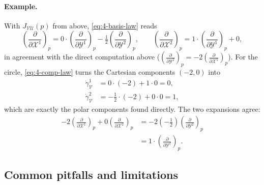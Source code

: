 \documentclass[11pt]{article}
\begin{document}
\paragraph{Example.} With $J_{\mathcal{VU}}(p)$ from above, \eqref{eq:4-basis-law} reads
\[
\left(\frac{\partial}{\partial\mathcal X^1}\right)_p=0\cdot\left(\frac{\partial}{\partial\mathcal Y^1}\right)_p-\tfrac12\left(\frac{\partial}{\partial\mathcal Y^2}\right)_p,\qquad
\left(\frac{\partial}{\partial\mathcal X^2}\right)_p=1\cdot\left(\frac{\partial}{\partial\mathcal Y^1}\right)_p+0,
\]
in agreement with the direct computation above ($\left(\frac{\partial}{\partial\mathcal Y^2}\right)_p=-2\left(\frac{\partial}{\partial\mathcal X^1}\right)_p$). For the circle, \eqref{eq:4-comp-law} turns the Cartesian components $(-2,0)$ into
\begin{align*}
\dot\gamma^1_{\mathcal V}&=0\cdot(-2)+1\cdot0=0,\\
\dot\gamma^2_{\mathcal V}&=-\tfrac12\cdot(-2)+0\cdot0=1,
\end{align*}
which are exactly the polar components found directly. The two expansions agree:
\begin{align*}
-2\left(\frac{\partial}{\partial\mathcal X^1}\right)_p+0\left(\frac{\partial}{\partial\mathcal X^2}\right)_p&=-2\left(-\tfrac12\right)\left(\frac{\partial}{\partial\mathcal Y^2}\right)_p\\
&=1\cdot\left(\frac{\partial}{\partial\mathcal Y^2}\right)_p.
\end{align*}

\subsection*{Common pitfalls and limitations}
\end{document}
